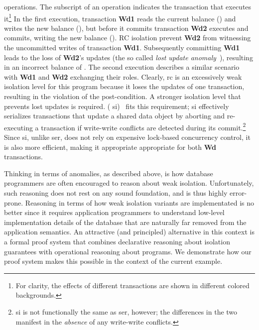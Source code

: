 operations.  The subscript of an operation indicates the transaction
that executes it\footnote{For clarity, the effects of different
  transactions are shown in different colored backgrounds.} In the
first execution, transaction {\bf Wd1} reads the current balance
() and writes the new balance (), but before it commits
transaction {\bf Wd2} executes and commits, writing the new balance
(). RC isolation prevent {\bf Wd2} from witnessing the
uncommitted writes of transaction {\bf Wd1}.  Subsequently committing
{\bf Wd1} leads to the loss of {\bf Wd2}'s updates (the so called
\emph{lost update anomaly}~\cite{berenson}), resulting in an incorrect
balance of . The second execution describes a similar scenario
with {\bf Wd1} and {\bf Wd2} exchanging their roles.  Clearly, {\sc
  rc} is an excessively weak isolation level for this program because
it loses the updates of one transaction, resulting in the violation of
the post-condition.  A stronger isolation level that prevents lost
updates is required.   ({\sc
  si})~\cite{berenson} fits this requirement; {\sc si} effectively
serializes transactions that update a shared data object by aborting
and re-executing a transaction if write-write conflicts are detected
during its commit.\footnote{{\sc si} is not functionally the same as
  {\sc ser}, however; the differences in the two manifest in the \emph{absence}
  of any write-write conflicts.}   Since {\sc si},
unlike {\sc ser}, does not rely on expensive lock-based
concurrency control, it is also more efficient, making it appropriate
appropriate for both {\bf Wd} transactions.

Thinking in terms of anomalies, as described above, is how database
programmers are often encouraged to reason about weak isolation.
Unfortunately, such reasoning does not rest on any sound foundation,
and is thus highly error-prone. Reasoning in terms of how weak
isolation variants are implementated is no better since it requires
application programmers to understand low-level implementation details
of the database that are naturally far removed from the application
semantics. An attractive (and principled) alternative in this context
is a formal proof system that combines declarative reasoning about
isolation guarantees with operational reasoning about programs. We
demonstrate how our proof system makes this possible in the context of
the current example.


